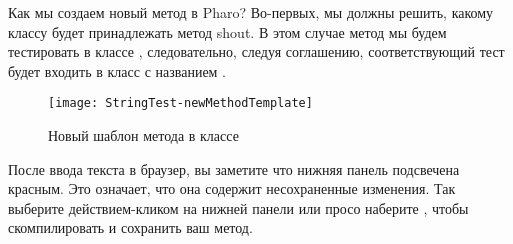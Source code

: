 \documentclass[a4paper,10pt,twoside]{book}
\begin{document}
Как мы создаем новый метод в Pharo? Во-первых, мы должны решить,
какому классу будет принадлежать метод shout. В этом случае метод
 мы будем тестировать в классе , следовательно,
следуя соглашению, соответствующий тест будет входить в класс с
названием . 

\begin{figure}[hbt]
\centerline {\texttt{[image: StringTest-newMethodTemplate]}}
\caption{Новый шаблон метода в классе 
}
\end{figure}


После ввода текста в браузер, вы заметите что нижняя панель подсвечена
красным. Это означает, что она содержит несохраненные изменения.
Так выберите  действием-кликом на нижней панели
или просо наберите  , чтобы скомпилировать
и сохранить ваш метод.

\end{document}

